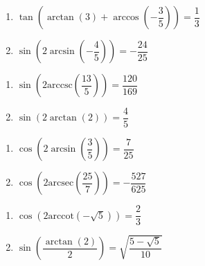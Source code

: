 \documentclass{ximera}
\begin{document}
\begin{multicols}{2}

\begin{enumerate}

\setcounter{enumi}{\value{HW}}

\item  $\tan\left( \arctan(3) + \arccos\left(-\dfrac{3}{5}\right) \right) = \dfrac{1}{3}$
\item  $\sin\left(2\arcsin\left(-\dfrac{4}{5}\right)\right)= -\dfrac{24}{25}$

\setcounter{HW}{\value{enumi}}

\end{enumerate}

\end{multicols}

\begin{multicols}{2}

\begin{enumerate}

\setcounter{enumi}{\value{HW}}

\item  $\sin\left(2\text{arccsc}\left(\dfrac{13}{5}\right)\right) = \dfrac{120}{169}$
\item  $\sin\left(2\arctan\left(2\right)\right) = \dfrac{4}{5}$ 

\setcounter{HW}{\value{enumi}}

\end{enumerate}

\end{multicols}

\begin{multicols}{2}

\begin{enumerate}

\setcounter{enumi}{\value{HW}}

\item  $\cos\left(2 \arcsin\left(\dfrac{3}{5}\right)\right) = \dfrac{7}{25}$
\item  $\cos\left(2 \text{arcsec}\left(\dfrac{25}{7}\right)\right) = -\dfrac{527}{625}$

\setcounter{HW}{\value{enumi}}

\end{enumerate}

\end{multicols}

\begin{multicols}{2}

\begin{enumerate}

\setcounter{enumi}{\value{HW}}

\item  $\cos\left(2 \text{arccot}\left(-\sqrt{5}\right)\right) = \dfrac{2}{3}$ 
\item  $\sin\left( \dfrac{\arctan(2)}{2} \right) = \sqrt{\dfrac{5-\sqrt{5}}{10}}$ 

\setcounter{HW}{\value{enumi}}

\end{enumerate}

\end{multicols}
\end{document}
